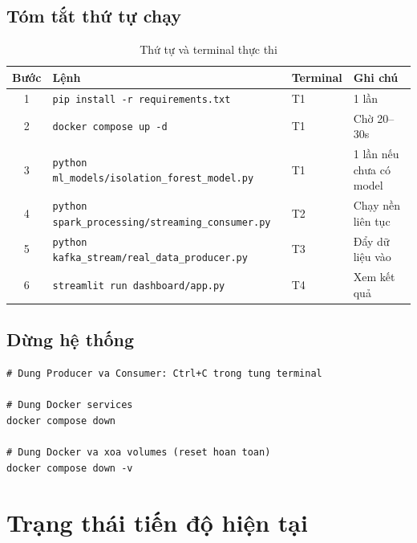 \documentclass[12pt,a4paper]{article}
\begin{document}
\subsection{Tóm tắt thứ tự chạy}

\begin{table}[H]
\centering
\begin{tabularx}{\linewidth}{c l l X}
\toprule
\textbf{Bước} & \textbf{Lệnh} & \textbf{Terminal} & \textbf{Ghi chú} \\
\midrule
1 & \texttt{pip install -r requirements.txt} & T1 & 1 lần \\
2 & \texttt{docker compose up -d} & T1 & Chờ 20--30s \\
3 & \texttt{python ml\_models/isolation\_forest\_model.py} & T1 & 1 lần nếu chưa có model \\
4 & \texttt{python spark\_processing/streaming\_consumer.py} & T2 & Chạy nền liên tục \\
5 & \texttt{python kafka\_stream/real\_data\_producer.py} & T3 & Đẩy dữ liệu vào \\
6 & \texttt{streamlit run dashboard/app.py} & T4 & Xem kết quả \\
\bottomrule
\end{tabularx}
\caption{Thứ tự và terminal thực thi}
\end{table}

\subsection{Dừng hệ thống}

\begin{lstlisting}[style=bash, caption={Dừng toàn bộ hệ thống}]
# Dung Producer va Consumer: Ctrl+C trong tung terminal

# Dung Docker services
docker compose down

# Dung Docker va xoa volumes (reset hoan toan)
docker compose down -v
\end{lstlisting}

\section{Trạng thái tiến độ hiện tại}
\end{document}
